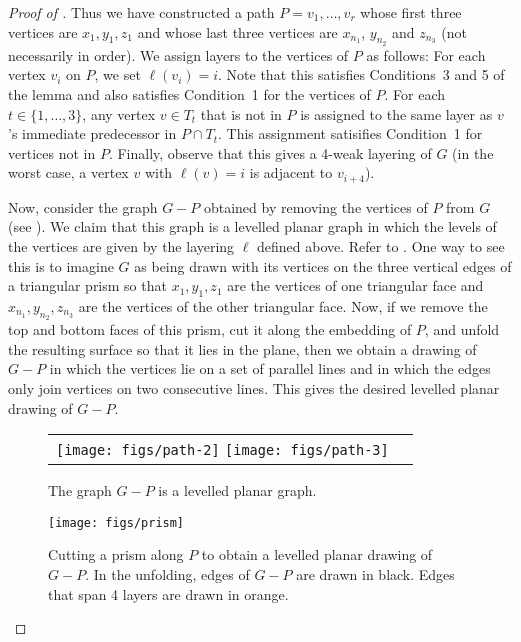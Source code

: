 \documentclass{patmorin}
\begin{document}
\begin{proof}[Proof of ]
  Thus we have constructed a path $P=v_1,\ldots,v_r$ whose first three
  vertices are $x_1,y_1,z_1$ and whose last three vertices are $x_{n_1}$,
  $y_{n_2}$ and $z_{n_3}$ (not necessarily in order).  We assign layers
  to the vertices of $P$ as follows: For each vertex $v_i$ on $P$,
  we set $\ell(v_i)=i$.  Note that this satisfies Conditions~3 and 5
  of the lemma and also satisfies Condition~1 for the vertices of $P$.
  For each $t\in\{1,\ldots,3\}$, any vertex $v\in T_t$ that is not in
  $P$ is assigned to the same layer as $v$'s immediate predecessor in
  $P\cap T_t$.  This assignment satisifies Condition~1 for vertices not
  in $P$.  Finally, observe that this gives a 4-weak layering of $G$ (in
  the worst case, a vertex $v$ with $\ell(v)=i$ is adjacent to $v_{i+4}$).

  Now, consider the graph $G-P$ obtained by removing the vertices of $P$
  from $G$ (see ).  We claim that this graph is a levelled
  planar graph \cite{bannister.devanny.ea:track} in which the levels
  of the vertices are given by the layering $\ell$ defined above.
  Refer to .  One way to see this is to imagine $G$
  as being drawn with its vertices on the three vertical edges of
  a triangular prism so that $x_1,y_1,z_1$ are the vertices of one
  triangular face and $x_{n_1},y_{n_2},z_{n_3}$ are the vertices of
  the other triangular face.  Now, if we remove the top and bottom
  faces of this prism, cut it along the embedding of $P$, and unfold
  the resulting surface so that it lies in the plane, then we obtain a
  drawing of $G-P$ in which the vertices lie on a set of parallel lines
  and in which the edges only join vertices on two consecutive lines.
  This gives the desired levelled planar drawing of $G-P$.

  \begin{figure}
  \begin{center}
  \begin{tabular}{cc}
  \texttt{[image: figs/path-2]}
  \texttt{[image: figs/path-3]}
  \end{tabular}
  \end{center}
  \caption{The graph $G-P$ is a levelled planar graph.}
  \end{figure}


  \begin{figure}
     \begin{center}
        \texttt{[image: figs/prism]}
     \end{center}
     \caption{Cutting a prism along $P$ to obtain a levelled planar
      drawing of $G-P$.
      In the unfolding, edges of $G-P$ are drawn in black. Edges that
      span 4 layers are drawn in orange.}
  \end{figure}


\end{proof}
\end{document}
